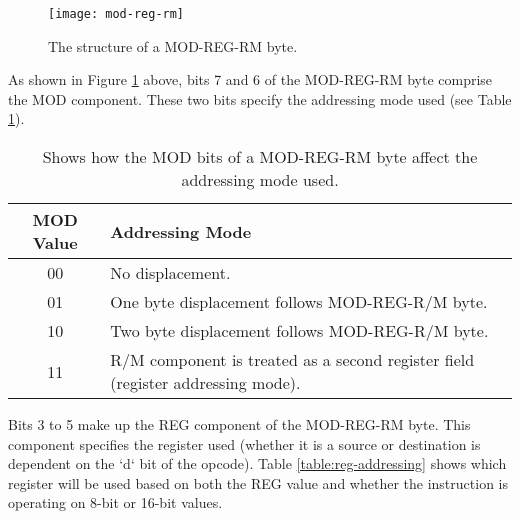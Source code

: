         \begin{figure}[h]
            \centering
            \texttt{[image: mod-reg-rm]}
            \caption{The structure of a MOD-REG-RM byte.}
            \label{fig:mod-reg-rm}
        \end{figure}

        As shown in Figure \ref{fig:mod-reg-rm} above, bits 7 and 6 of the MOD-REG-RM byte comprise the MOD component. These two bits specify the addressing mode used (see Table \ref{table:mod-addressing-mode}).

        \begin{table}[h]
            \centering
            \begin{tabular} { | c | m{} | }
                \hline
                MOD Value & Addressing Mode \\
                \hline
                00  & No displacement. \\
                01  & One byte displacement follows MOD-REG-R/M byte. \\
                10  & Two byte displacement follows MOD-REG-R/M byte. \\
                11  & R/M component is treated as a second register field (register addressing mode). \\
                \hline
            \end{tabular}
            \caption{Shows how the MOD bits of a MOD-REG-RM byte affect the addressing mode used.}
            \label{table:mod-addressing-mode}
        \end{table}

        Bits 3 to 5 make up the REG component of the MOD-REG-RM byte. This component specifies the register used (whether it is a source or destination is dependent on the `d` bit of the opcode). Table \ref{table:reg-addressing} shows which register will be used based on both the REG value and whether the instruction is operating on 8-bit or 16-bit values.

